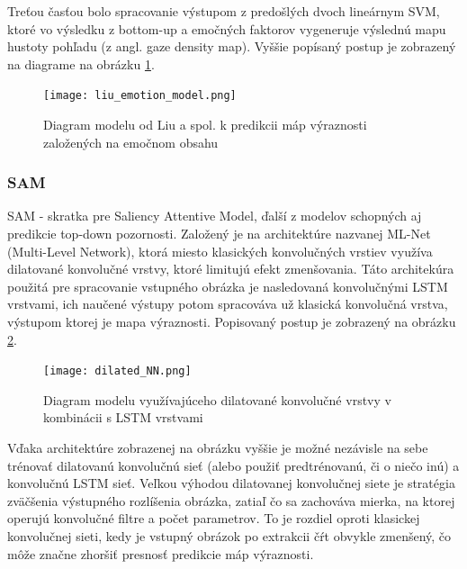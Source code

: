 Treťou časťou bolo spracovanie výstupom z predošlých dvoch lineárnym SVM, ktoré vo výsledku z bottom-up a emočných faktorov vygeneruje výslednú mapu hustoty pohľadu (z angl. gaze density map). Vyššie popísaný postup je zobrazený na diagrame na obrázku \ref{liu_image}.

\begin{figure}[H]
	\begin{center}
		\texttt{[image: liu\_emotion\_model.png]}
		\caption[Diagram modelu k predikcii máp výraznosti založených na emočnom obsahu]{Diagram modelu od Liu a spol. k predikcii máp výraznosti založených na emočnom obsahu\cite{liu2016improving}\label{liu_image}}
	\end{center}
\end{figure}


\subsubsection{SAM}
SAM - skratka pre Saliency Attentive Model\cite{cornia2016predicting}, ďalší z modelov schopných aj predikcie top-down pozornosti. Založený je na architektúre nazvanej ML-Net (Multi-Level Network\cite{cornia2016deep}), ktorá miesto klasických konvolučných vrstiev využíva dilatované konvolučné vrstvy, ktoré limitujú efekt zmenšovania. Táto architekúra použitá pre spracovanie vstupného obrázka je nasledovaná konvolučnými LSTM vrstvami, ich naučené výstupy potom spracováva už klasická konvolučná vrstva, výstupom ktorej je mapa výraznosti. Popisovaný postup je zobrazený na obrázku \ref{dilated_model_image}.

\begin{figure}[H]
	\begin{center}
		\texttt{[image: dilated\_NN.png]}
		\caption[Diagram konvolučnej LSTM siete]{Diagram modelu využívajúceho dilatované konvolučné vrstvy v kombinácii s LSTM vrstvami \cite{cornia2016predicting}\label{dilated_model_image}}
	\end{center}
\end{figure}

Vďaka architektúre zobrazenej na obrázku vyššie je možné nezávisle na sebe trénovať dilatovanú konvolučnú sieť (alebo použiť predtrénovanú, či o niečo inú) a konvolučnú LSTM sieť. Veľkou výhodou dilatovanej konvolučnej siete je stratégia zväčšenia výstupného rozlíšenia obrázka, zatiaľ čo sa zachováva mierka, na ktorej operujú konvolučné filtre a počet parametrov. To je rozdiel oproti klasickej konvolučnej sieti, kedy je vstupný obrázok po extrakcii čŕt obvykle zmenšený, čo môže značne zhoršiť presnosť predikcie máp výraznosti.

